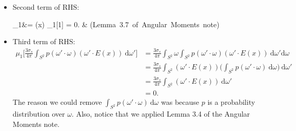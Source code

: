 \documentclass[10pt]{article}
\newcommand{\dee}{\mathrm{d}}
\begin{document}
\begin{itemize}
\begin{itemize}
				  \item Second term of RHS:
				  \begin{flalign*}
  				  \mu_1 &=  \phi(x) \mu_1[1] = 0. &
  				  \mbox{(Lemma 3.7 of Angular Moments note)}
  				\end{flalign*}
  				
  				\item Third term of RHS:
  				\begin{align*}
  				  \mu_1 \bigg[ \frac{3\sigma_s}{4\pi} \int_{S^2} p(\omega' \cdot \omega) (\omega' \cdot E(x))\ \dee \omega' \bigg] 
  				  &= \frac{3\sigma_s}{4\pi} \int_{S^2} \omega \int_{S^2} p(\omega' \cdot \omega) (\omega' \cdot E(x))\ \dee \omega' \dee \omega\\
  				  &= \frac{3\sigma_s}{4\pi} \int_{S^2} (\omega' \cdot E(x)) \bigg( \int_{S^2} p(\omega' \cdot \omega)\ \dee \omega\bigg) \ \dee \omega'\\
  				  &= \frac{3\sigma_s}{4\pi} \int_{S^2} (\omega' \cdot E(x)) \ \dee \omega'\\
  				  &= 0.
  				\end{align*}
  				The reason we could remove $\int_{S^2} p(\omega' \cdot \omega)\ \dee \omega$ was because $p$ is a probability distribution over $\omega$.
  				Also, notice that we applied Lemma 3.4 of the Angular Moments note.
				\end{itemize}	
        
		\end{itemize}
 	
	
\end{document}
